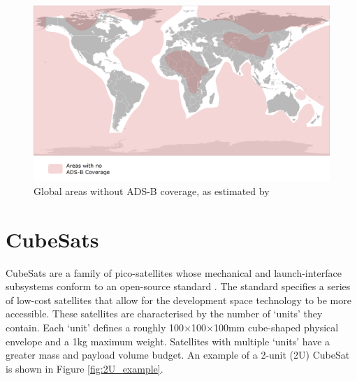 \begin{figure}[H]
	\centering
	\includegraphics[scale = 0.23]{Pictures/adsb_nocoverage.png}
	
	\caption[Global areas without ADS-B coverage]{Global areas without ADS-B coverage, as estimated by \cite{ADS-B:Aireon_brochure}}
	\label{fig:adsb_nocoverage}
\end{figure}

\newpage
\section{CubeSats}
CubeSats are a family of pico-satellites whose mechanical and launch-interface subsystems conform to an open-source standard \cite{Lee2011}. The standard specifies a series of low-cost satellites that allow for the development space technology to be more accessible. These satellites are characterised by the number of `units' they contain. Each `unit' defines a roughly 100$\times$100$\times$100mm cube-shaped physical envelope and a 1kg maximum weight. Satellites with multiple `units' have a greater mass and payload volume budget. An example of a 2-unit (2U) CubeSat is shown in Figure \ref{fig:2U_example}.

